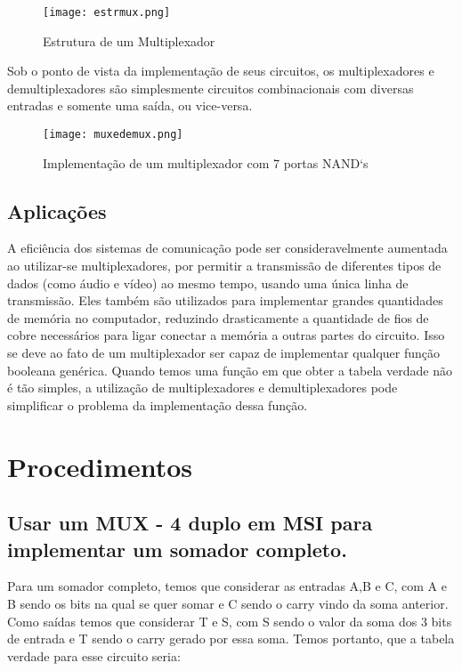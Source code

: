 \documentclass[12pt]{article}
\begin{document}
\begin{figure}[H]
	\centering
	\texttt{[image: estrmux.png]}
	\caption{Estrutura de um Multiplexador}
	\label{fig:estmux}
\end{figure}

Sob o ponto de vista da implementação de seus circuitos, os multiplexadores e demultiplexadores são simplesmente circuitos combinacionais com diversas entradas e somente uma saída, ou vice-versa.

\begin{figure}[H]
	\centering
	\texttt{[image: muxedemux.png]}
	\caption{Implementação de um multiplexador com 7 portas NAND`s}
	\label{fig:muxedemux}
\end{figure}

\subsection{Aplicações}
	A eficiência dos sistemas de comunicação pode ser consideravelmente aumentada ao utilizar-se multiplexadores, por permitir a transmissão de diferentes tipos de dados (como áudio e vídeo) ao mesmo tempo, usando uma única linha de transmissão. Eles também são utilizados para implementar grandes quantidades de memória no computador, reduzindo drasticamente a quantidade de fios de cobre necessários para ligar conectar a memória a outras partes do circuito. Isso se deve ao fato de um multiplexador ser capaz de implementar qualquer função booleana genérica. Quando temos uma função em que obter a tabela verdade não é tão simples, a utilização de multiplexadores e demultiplexadores pode simplificar o problema da implementação dessa função.
	
\section{Procedimentos}
\label{sec:Procedimentos}

\subsection{Usar um MUX - 4 duplo em MSI para implementar um somador completo.}
\label{sec:Mux}

Para um somador completo, temos que considerar as entradas A,B e C, com A e B sendo os bits na qual se quer somar e C sendo o carry vindo da soma anterior. Como saídas temos que considerar T e S, com S sendo o valor da soma dos 3 bits de entrada e T sendo o carry gerado por essa soma.	Temos portanto, que a tabela verdade para esse circuito seria:
\end{document}
